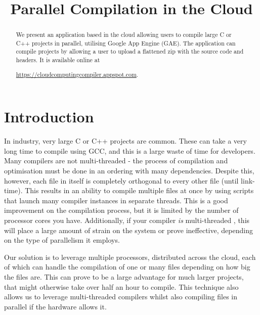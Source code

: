 \documentclass[conference]{IEEEtran}
\begin{document}
\title{Parallel Compilation in the Cloud}

\author{
\and
{}
}

\maketitle

\begin{abstract}
We present an application based in the cloud allowing users to compile large C
or C++ projects in parallel, utilising Google App Engine (GAE). The application
can compile projects by allowing a user to upload a flattened zip with the
source code and headers. It is available online at

\noindent\url{https://cloudcomputingcompiler.appspot.com}.

\end{abstract}
\section{Introduction}
In industry, very large C or C++ projects are common. These can take a very
long time to compile using GCC, and this is a
large waste of time for developers. Many compilers are not multi-threaded - the
process of compilation and optimisation must be done in an ordering
with many dependencies. Despite this, however, each file in itself is completely
orthogonal to every other file (until link-time). This results in an ability to
compile multiple files at once by using scripts that launch many compiler
instances in separate threads. This is a good improvement on the compilation
process, but it is limited by the number of processor cores you have.
Additionally, if your compiler \emph{is} multi-threaded \cite{rust}, this will
place a large amount of strain on the system or prove ineffective, depending on
the type of parallelism it employs.

Our solution is to leverage multiple processors, distributed across the cloud,
each of which can handle the compilation of one or many files depending on how
big the files are. This can prove to be a large advantage for much larger
projects, that might otherwise take over half an hour to compile. This technique
also allows us to leverage multi-threaded compilers whilst also compiling files
in parallel if the hardware allows it.
\end{document}
